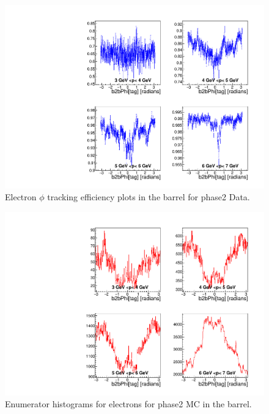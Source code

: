 \documentclass[a4paper,11pt,twosided,final,german,openbib,pdftex,listof=totoc,bibliography=totoc]{scrbook}
\begin{document}
\begin{appendix}
\begin{figure}[!htbp]
	\centering
	\includegraphics[width=\textwidth]{Plots/master/xPMPhiemBarrel_Data}
	\caption[Momentum $\phi$ Electron Barrel Efficiency Phase2 Data]{Electron $\phi$ tracking efficiency plots in the barrel for phase2 Data.}
	\label{plt:PMPhiemBarrel_Data}
\end{figure}


\begin{figure}[!htbp]
	\centering
	\includegraphics[width=\textwidth]{Plots/master/xPMPhiemBarrelE_MC}
	\caption[Momentum $\phi$ Electron Barrel Enumerator Histogram Phase2 MC]{Enumerator histograms for electrons for phase2 MC in the barrel.}
	\label{plt:PMPhiemBarrelE_MC}
\end{figure}


\end{appendix}
\end{document}

